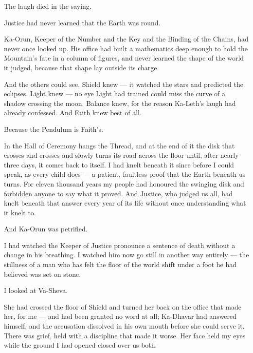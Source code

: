 The laugh died in the saying.\par
 
Justice had never learned that the Earth was round.\par
 
Ka-Orun, Keeper of the Number and the Key and the Binding of the Chains, had never once looked up. His office had built a mathematics deep enough to hold the Mountain's fate in a column of figures, and never learned the shape of the world it judged, because that shape lay outside its charge.\par
 
And the others could see. Shield knew --- it watched the stars and predicted the eclipses. Light knew --- no eye Light had trained could miss the curve of a shadow crossing the moon. Balance knew, for the reason Ka-Leth's laugh had already confessed. And Faith knew best of all.\par
 
Because the Pendulum is Faith's.\par
 
In the Hall of Ceremony hangs the Thread, and at the end of it the disk that crosses and crosses and slowly turns its road across the floor until, after nearly three days, it comes back to itself. I had knelt beneath it since before I could speak, as every child does --- a patient, faultless proof that the Earth beneath us turns. For eleven thousand years my people had honoured the swinging disk and forbidden anyone to say what it proved. And Justice, who judged us all, had knelt beneath that answer every year of its life without once understanding what it knelt to.\par
 
\ornament

 
And Ka-Orun was petrified.\par
 
I had watched the Keeper of Justice pronounce a sentence of death without a change in his breathing. I watched him now go still in another way entirely --- the stillness of a man who has felt the floor of the world shift under a foot he had believed was set on stone.\par
 
I looked at Va-Sheva.\par
 
She had crossed the floor of Shield and turned her back on the office that made her, for me --- and had been granted no word at all; Ka-Dhavar had answered himself, and the accusation dissolved in his own mouth before she could serve it. There was grief, held with a discipline that made it worse. Her face held my eyes while the ground I had opened closed over us both.\par
 
